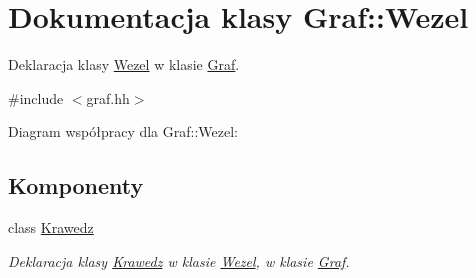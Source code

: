 \hypertarget{class_graf_1_1_wezel}{\section{\-Dokumentacja klasy \-Graf\-:\-:\-Wezel}
\label{class_graf_1_1_wezel}
}


\-Deklaracja klasy \hyperlink{class_graf_1_1_wezel}{\-Wezel} w klasie \hyperlink{class_graf}{\-Graf}.  




{\ttfamily \#include $<$graf.\-hh$>$}



\-Diagram współpracy dla \-Graf\-:\-:\-Wezel\-:
\subsection*{\-Komponenty}
\begin{DoxyCompactItemize}
\item 
class \hyperlink{class_graf_1_1_wezel_1_1_krawedz}{\-Krawedz}
\begin{DoxyCompactList}\small\item\em \-Deklaracja klasy \hyperlink{class_graf_1_1_wezel_1_1_krawedz}{\-Krawedz} w klasie \hyperlink{class_graf_1_1_wezel}{\-Wezel}, w klasie \hyperlink{class_graf}{\-Graf}. \end{DoxyCompactList}\end{DoxyCompactItemize}
